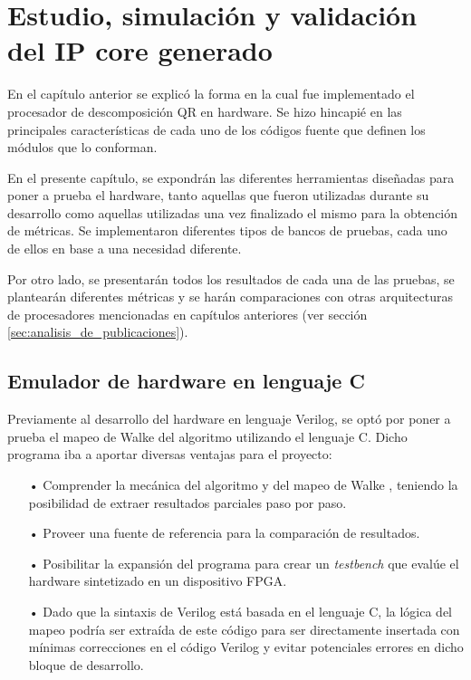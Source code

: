 \chapter{Estudio, simulación y validación del IP core generado}

En el capítulo anterior se explicó la forma en la cual fue implementado el procesador de descomposición QR en hardware. Se hizo hincapié en las principales características de cada uno de los códigos fuente que definen los módulos que lo conforman.

En el presente capítulo, se expondrán las diferentes herramientas diseñadas para poner a prueba el hardware, tanto aquellas que fueron utilizadas durante su desarrollo como aquellas utilizadas una vez finalizado el mismo para la obtención de métricas. Se implementaron diferentes tipos de bancos de pruebas, cada uno de ellos en base a una necesidad diferente.

Por otro lado, se presentarán todos los resultados de cada una de las pruebas, se plantearán diferentes métricas y se harán comparaciones con otras arquitecturas de procesadores mencionadas en capítulos anteriores (ver sección \ref{sec:analisis_de_publicaciones}).

\section{Emulador de hardware en lenguaje C}

Previamente al desarrollo del hardware en lenguaje Verilog, se optó por poner a prueba el mapeo de Walke del algoritmo utilizando el lenguaje C. Dicho programa iba a aportar diversas ventajas para el proyecto:

\begin{itemize}
   \item[•] Comprender la mecánica del algoritmo y del mapeo de Walke \cite{Walke}, teniendo la posibilidad de extraer resultados parciales paso por paso.
   \item[•] Proveer una fuente de referencia para la comparación de resultados.
   \item[•] Posibilitar la expansión del programa para crear un \textit{testbench} que evalúe el hardware sintetizado en un dispositivo FPGA.
   \item[•] Dado que la sintaxis de Verilog está basada en el lenguaje C, la lógica del mapeo podría ser extraída de este código para ser directamente insertada con mínimas correcciones en el código Verilog y evitar potenciales errores en dicho bloque de desarrollo.
\end{itemize}

